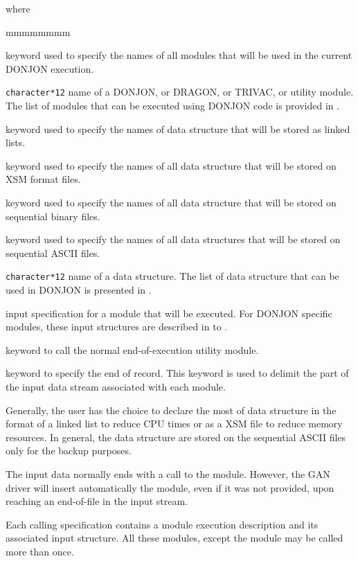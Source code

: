 \noindent where
\begin{ListeDeDescription}{mmmmmmmm}

\item[\moc{MODULE}]  keyword used to specify the names of all modules
that will be used in the current DONJON execution.

\item[\dusa{MODNAME}] {\tt character*12} name of a DONJON, or
DRAGON, or TRIVAC, or utility module. The list of modules that can be
executed using DONJON code is provided in .

\item[\moc{LINKED\_LIST}]  keyword used to specify the names of data
structure that will be stored as linked lists. 

\item[\moc{XSM\_FILE}]  keyword used to specify the names of all data
structure that will be stored on XSM format files. 

\item[\moc{SEQ\_BINARY}]  keyword used to specify the names of all
data structure that will be stored on sequential binary files. 

\item[\moc{SEQ\_ASCII}]  keyword used to specify the names of all
data structures that will be stored on sequential ASCII files. 

\item[\dusa{STRNAME}] {\tt character*12} name of a data structure.
The list of data structure that can be used in DONJON is presented in .

\item[\dstr{module}] input specification for a module that will be executed.
For DONJON specific modules, these input structures are described in
 to .

\item[\moc{END:}] keyword to call the normal end-of-execution utility module.

\item[\moc{;}] keyword to specify the end of record. This keyword is used
to delimit the part of the input data stream associated with each module.

\end{ListeDeDescription}


\vskip 0.2cm
Generally, the user has the choice to declare the most of data structure
in the format of a linked list to reduce CPU times or as a XSM file to reduce
memory resources. In general, the data structure are stored on the sequential
ASCII files only for the backup purposes.

\vskip 0.2cm

The input data normally ends with a call to the  module.
However, the GAN driver will insert automatically the 
module, even if it was not provided, upon reaching an end-of-file
in the input stream.

\vskip 0.2cm

Each  calling specification contains a module execution
description and its associated input structure. All these modules, except
the  module may be called more than once.
